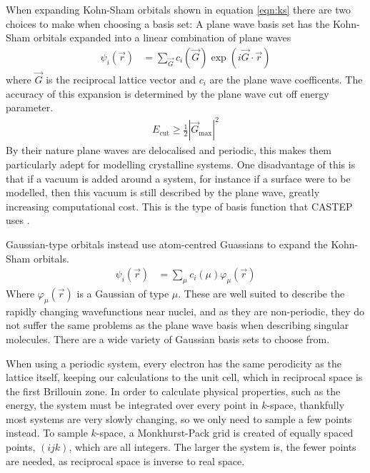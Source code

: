 \documentclass[10pt,a4paper,twocolumn,twoside]{extarticle}
\begin{document}
When expanding Kohn-Sham orbitals shown in equation \ref{eqn:ks} there are two choices to make when choosing a basis set:  A plane wave basis set has the Kohn-Sham orbitals expanded into a linear combination of plane waves 
\begin{align*}
		\psi_i(\vec{r}) &= \sum_{\vec{G}} c_i(\vec{G}) \exp(i\vec{G}\cdot\vec{r})
\end{align*}
where $\vec{G}$ is the reciprocal lattice vector and $c_i$ are the plane wave coefficents. The accuracy of this expansion is determined by the plane wave cut off energy parameter.
\begin{align*}
	E_\text{cut} \geq \frac{1}{2}|{\vec{G}_\text{max}}|^2
\end{align*}
By their nature plane waves are delocalised and periodic, this makes them particularly adept for modelling crystalline systems. One disadvantage of this is that if a vacuum is added around a system, for instance if a surface were to be modelled, then this vacuum is still described by the plane wave, greatly increasing computational cost. This is the type of basis function that CASTEP uses \cite{CASTEP}.

Gaussian-type orbitals instead use atom-centred Guassians to expand the Kohn-Sham orbitals. 
\begin{align*}
	\psi_i(\vec{r}) &= \sum_{\mu} c_i(\mu) \varphi_\mu(\vec{r})
\end{align*}
Where $\varphi_\mu(\vec{r})$ is a Gaussian of type $\mu$. These are well suited to describe the rapidly changing wavefunctions near nuclei, and as they are non-periodic, they do not suffer the same problems as the plane wave basis when describing singular molecules. There are a wide variety of Gaussian basis sets to choose from.

When using a periodic system, every electron has the same perodicity as the lattice itself, keeping our calculations to the unit cell, which in reciprocal space is the first Brillouin zone. In order to calculate physical properties, such as the energy, the system must be integrated over every point in $k$-space, thankfully most systems are very slowly changing, so we only need to sample a few points instead. To sample $k$-space, a Monkhurst-Pack grid is created of equally spaced points, $(ijk)$, which are all integers. The larger the system is, the fewer points are needed, as reciprocal space is inverse to real space.
\end{document}
